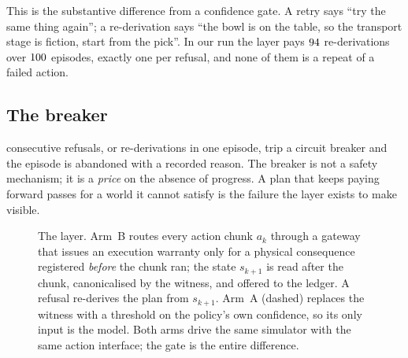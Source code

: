 \documentclass[conference]{IEEEtran}
\theoremstyle{definition}
\begin{document}
This is the substantive difference from a confidence gate. A retry says ``try
the same thing again''; a re-derivation says ``the bowl is on the table, so the
transport stage is fiction, start from the pick''. In our run the layer pays
$94$ re-derivations over $100$ episodes, exactly one per
refusal, and none of them is a repeat of a failed action.

\subsection{The breaker}

\BreakerTrips{} consecutive refusals, or \MaxReplans{} re-derivations in one episode, trip a
circuit breaker and the episode is abandoned with a recorded reason. The
breaker is not a safety mechanism; it is a \emph{price} on the absence of
progress. A plan that keeps paying forward passes for a world it cannot satisfy
is the failure the layer exists to make visible.

\begin{figure}[t]
\centering
{}
\caption{The layer. Arm~B routes every action chunk $a_k$ through a gateway that
issues an execution warranty only for a physical consequence registered \emph{before} the
chunk ran; the state $s_{k+1}$ is read after the chunk, canonicalised by the
witness, and offered to the ledger. A refusal re-derives the plan from
$s_{k+1}$. Arm~A (dashed) replaces the witness with a threshold on the policy's
own confidence, so its only input is the model. Both arms drive the same
simulator with the same action interface; the gate is the entire difference.}
\label{fig:arch}
\end{figure}
\end{document}
